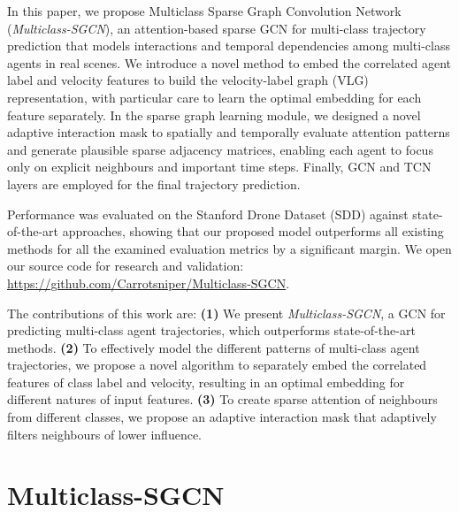 \documentclass{article}
\begin{document}
In this paper, we propose Multiclass Sparse Graph Convolution Network (\textit{Multiclass-SGCN}), an attention-based sparse GCN for multi-class trajectory prediction  that models interactions and temporal dependencies among multi-class agents in real scenes. 
We introduce a novel method to embed the correlated agent label and velocity features to build the velocity-label graph (VLG) representation, with particular care to learn the optimal embedding for each feature separately. In the sparse graph learning module, we designed a novel adaptive interaction mask to spatially and temporally evaluate attention patterns and generate plausible sparse adjacency matrices, enabling each agent to focus only on explicit neighbours and important time steps. Finally,  GCN \cite{kipf2016gcn} and TCN \cite{bai2018tcn} layers are employed for the final trajectory prediction.


Performance was evaluated on the Stanford Drone Dataset (SDD) \cite{Robicquet2016SDD} against state-of-the-art approaches, showing that our proposed model outperforms all existing methods for all the examined evaluation metrics by a significant margin. We open our source code for research and validation: {\color{blue} \url{https://github.com/Carrotsniper/Multiclass-SGCN}}.

The contributions of this work are: \textbf{(1)} We present \textit{Multiclass-SGCN}, a GCN for predicting multi-class agent trajectories, which outperforms state-of-the-art methods. \textbf{(2)} To effectively model the different patterns of multi-class agent trajectories, we propose a novel algorithm to separately embed the correlated features of class label and velocity, resulting in an optimal embedding for different natures of input features. \textbf{(3)} To create sparse attention of neighbours from different classes, we propose an adaptive interaction mask that adaptively filters neighbours of lower influence.



















\section{Multiclass-SGCN}
\label{sec:methodology}
\end{document}

